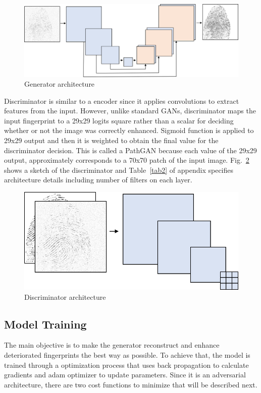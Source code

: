 \documentclass[a4paper,fleqn]{cas-dc}
\begin{document}
\begin{figure}[htbp]
\centerline{\includegraphics[scale=0.37]{figs/generator.png}}
\caption{Generator architecture}
\label{fig4}
\end{figure}

Discriminator is similar to a encoder since it applies convolutions to extract features from the input. However, unlike standard GANs, discriminator maps the input fingerprint to a 29x29 logits square rather than a scalar for deciding whether or not the image was correctly enhanced. Sigmoid function is applied to 29x29 output and then it is weighted to obtain the final value for the discriminator decision. This is called a PathGAN because each value of the 29x29 output, approximately corresponds to a 70x70 patch of the input image. Fig.~\ref{fig5} shows a sketch of the discriminator and Table~\ref{tab2} of appendix specifies architecture details including number of filters on each layer.

\begin{figure}[htbp]
\centerline{\includegraphics[scale=0.4]{figs/discriminator.png}}
\caption{Discriminator architecture}
\label{fig5}
\end{figure}

\subsection{Model Training}
\label{sec:MT}
The main objective is to make the generator reconstruct and enhance deteriorated fingerprints the best way as possible. To achieve that, the model is trained through a optimization process that uses back propagation to calculate gradients and adam optimizer to update parameters. Since it is an adversarial architecture, there are two cost functions to minimize that will be described next.
\end{document}
